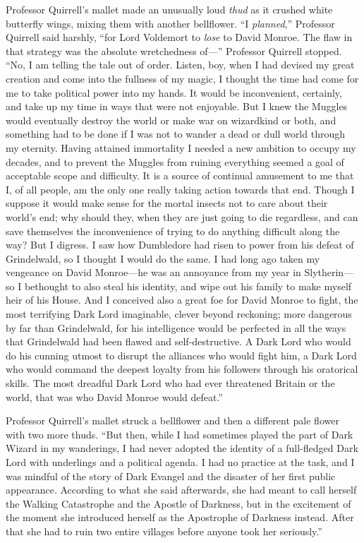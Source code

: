 Professor Quirrell’s mallet made an unusually loud \emph{thud} as it crushed white butterfly wings, mixing them with another bellflower. “I \emph{planned},” Professor Quirrell said harshly, “for Lord Voldemort to \emph{lose} to David Monroe. The flaw in that strategy was the absolute wretchedness of—” Professor Quirrell stopped. “No, I am telling the tale out of order. Listen, boy, when I had devised my great creation and come into the fullness of my magic, I thought the time had come for me to take political power into my hands. It would be inconvenient, certainly, and take up my time in ways that were not enjoyable. But I knew the Muggles would eventually destroy the world or make war on wizardkind or both, and something had to be done if I was not to wander a dead or dull world through my eternity. Having attained immortality I needed a new ambition to occupy my decades, and to prevent the Muggles from ruining everything seemed a goal of acceptable scope and difficulty. It is a source of continual amusement to me that I, of all people, am the only one really taking action towards that end. Though I suppose it would make sense for the mortal insects not to care about their world’s end; why should they, when they are just going to die regardless, and can save themselves the inconvenience of trying to do anything difficult along the way? But I digress. I saw how Dumbledore had risen to power from his defeat of Grindelwald, so I thought I would do the same. I had long ago taken my vengeance on David Monroe—he was an annoyance from my year in Slytherin—so I bethought to also steal his identity, and wipe out his family to make myself heir of his House. And I conceived also a great foe for David Monroe to fight, the most terrifying Dark Lord imaginable, clever beyond reckoning; more dangerous by far than Grindelwald, for his intelligence would be perfected in all the ways that Grindelwald had been flawed and self-destructive. A Dark Lord who would do his cunning utmost to disrupt the alliances who would fight him, a Dark Lord who would command the deepest loyalty from his followers through his oratorical skills. The most dreadful Dark Lord who had ever threatened Britain or the world, that was who David Monroe would defeat.”

Professor Quirrell’s mallet struck a bellflower and then a different pale flower with two more thuds. “But then, while I had sometimes played the part of Dark Wizard in my wanderings, I had never adopted the identity of a full-fledged Dark Lord with underlings and a political agenda. I had no practice at the task, and I was mindful of the story of Dark Evangel and the disaster of her first public appearance. According to what she said afterwards, she had meant to call herself the Walking Catastrophe and the Apostle of Darkness, but in the excitement of the moment she introduced herself as the Apostrophe of Darkness instead. After that she had to ruin two entire villages before anyone took her seriously.”

